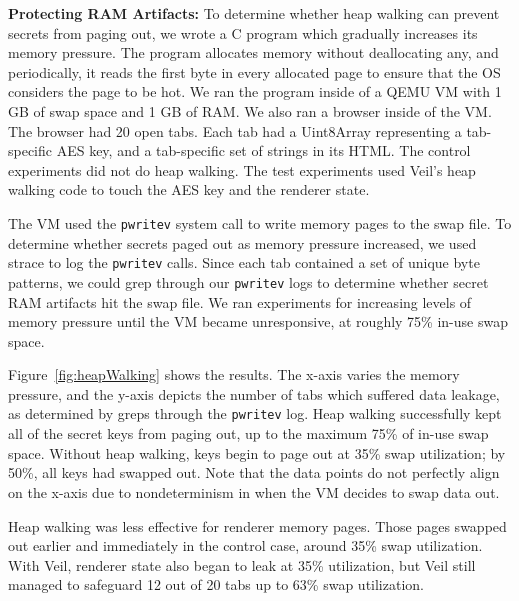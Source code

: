\noindent
{\bf Protecting RAM Artifacts:} To determine
whether heap walking can prevent secrets from
paging out, we wrote a C program which gradually
increases its memory pressure. The program allocates
memory without deallocating any, and periodically,
it reads the first byte in every allocated page
to ensure that the OS considers the page to be hot.
We ran the program inside of a QEMU VM with 1 GB
of swap space and 1 GB of RAM. We also ran a browser
inside of the VM. The browser had 20 open tabs.
Each tab had a Uint8Array representing a tab-specific
AES key, and a tab-specific set of strings in its
HTML. The control experiments did not do heap walking.
The test experiments used Veil's heap walking code
to touch the AES key and the renderer state.

The VM used the \texttt{pwritev} system call to
write memory pages to the swap file. To determine
whether secrets paged out as memory pressure
increased, we used strace to log the \texttt{pwritev}
calls. Since each tab contained a set of 
unique byte patterns, we could grep through our
\texttt{pwritev} logs to determine whether secret
RAM artifacts hit the swap file. We ran experiments
for increasing levels of memory pressure until the
VM became unresponsive, at roughly 75\% in-use
swap space.

Figure~\ref{fig:heapWalking} shows the results.
The x-axis varies the memory pressure, and the
y-axis depicts the number of tabs which suffered
data leakage, as determined by greps through the
\texttt{pwritev} log. Heap walking successfully
kept all of the secret keys from paging out, up
to the maximum 75\% of in-use swap space. Without
heap walking, keys begin to page out at 35\%
swap utilization; by 50\%, all keys had swapped
out. Note that the data points do not perfectly
align on the x-axis due to nondeterminism in
when the VM decides to swap data out.

Heap walking was less effective for renderer
memory pages. Those pages swapped out earlier
and immediately in the control case, around
35\% swap utilization. With Veil, renderer state
also began to leak at 35\% utilization, but
Veil still managed to safeguard 12 out of 20 tabs
up to 63\% swap utilization.


